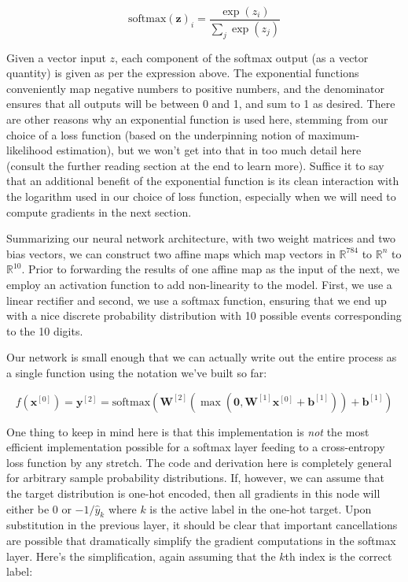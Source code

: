\[\mathrm{softmax}(\mathbf{z})_i = \frac{\exp(z_i)}{\sum_j \exp(z_j)}\]

Given a vector input \(z\), each component of the softmax output (as a
vector quantity) is given as per the expression above. The exponential
functions conveniently map negative numbers to positive numbers, and the
denominator ensures that all outputs will be between 0 and 1, and sum to
1 as desired. There are other reasons why an exponential function is
used here, stemming from our choice of a loss function (based on the
underpinning notion of maximum-likelihood estimation), but we won't get
into that in too much detail here (consult the further reading section
at the end to learn more). Suffice it to say that an additional benefit
of the exponential function is its clean interaction with the logarithm
used in our choice of loss function, especially when we will need to
compute gradients in the next section.

Summarizing our neural network architecture, with two weight matrices
and two bias vectors, we can construct two affine maps which map vectors
in \(\mathbb{R}^{784}\) to \(\mathbb{R}^n\) to \(\mathbb{R}^{10}\).
Prior to forwarding the results of one affine map as the input of the
next, we employ an activation function to add non-linearity to the
model. First, we use a linear rectifier and second, we use a softmax
function, ensuring that we end up with a nice discrete probability
distribution with 10 possible events corresponding to the 10 digits.

Our network is small enough that we can actually write out the entire
process as a single function using the notation we've built so far:

\[f(\mathbf{x}^{[0]}) = \mathbf{y}^{[2]} = \mathrm{softmax}\left(\mathbf{W}^{[2]}\left(\max\left(\mathbf{0}, \mathbf{W}^{[1]}\mathbf{x}^{[0]} + \mathbf{b}^{[1]}\right) \right) + \mathbf{b}^{[1]} \right)\]

One thing to keep in mind here is that this implementation is \emph{not}
the most efficient implementation possible for a softmax layer feeding
to a cross-entropy loss function by any stretch. The code and derivation
here is completely general for arbitrary sample probability
distributions. If, however, we can assume that the target distribution
is one-hot encoded, then all gradients in this node will either be 0 or
\(-1/\hat{y}_k\) where \(k\) is the active label in the one-hot target.
Upon substitution in the previous layer, it should be clear that
important cancellations are possible that dramatically simplify the
gradient computations in the softmax layer. Here's the simplification,
again assuming that the \(k\)th index is the correct label:

